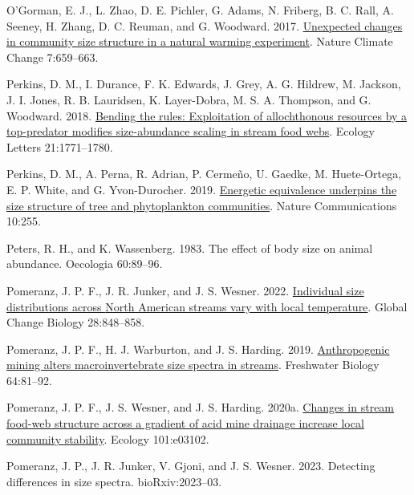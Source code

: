 \documentclass[
  12pt,
]{article}
\newlength{\cslhangindent}
\newlength{\cslentryspacingunit} %
\newenvironment{CSLReferences}[2] %
 {%
  \setlength{\parindent}{0pt}
  \ifodd #1
  \let\oldpar\par
  \def\par{\hangindent=\cslhangindent\oldpar}
  \fi
  \setlength{\parskip}{#2\cslentryspacingunit}
 }%
 {}
\begin{document}
\begin{CSLReferences}{1}{0}
\leavevmode{}%
O'Gorman, E. J., L. Zhao, D. E. Pichler, G. Adams, N. Friberg, B. C.
Rall, A. Seeney, H. Zhang, D. C. Reuman, and G. Woodward. 2017.
\href{https://doi.org/10.1038/nclimate3368}{Unexpected changes in
community size structure in a natural warming experiment}. Nature
Climate Change 7:659--663.

\leavevmode{}%
Perkins, D. M., I. Durance, F. K. Edwards, J. Grey, A. G. Hildrew, M.
Jackson, J. I. Jones, R. B. Lauridsen, K. Layer-Dobra, M. S. A.
Thompson, and G. Woodward. 2018.
\href{https://doi.org/10.1111/ele.13147}{Bending the rules: Exploitation
of allochthonous resources by a top-predator modifies size-abundance
scaling in stream food webs}. Ecology Letters 21:1771--1780.

\leavevmode{}%
Perkins, D. M., A. Perna, R. Adrian, P. Cermeño, U. Gaedke, M.
Huete-Ortega, E. P. White, and G. Yvon-Durocher. 2019.
\href{https://doi.org/10.1038/s41467-018-08039-3}{Energetic equivalence
underpins the size structure of tree and phytoplankton communities}.
Nature Communications 10:255.

\leavevmode{}%
Peters, R. H., and K. Wassenberg. 1983. The effect of body size on
animal abundance. Oecologia 60:89--96.

\leavevmode{}%
Pomeranz, J. P. F., J. R. Junker, and J. S. Wesner. 2022.
\href{https://doi.org/10.1111/gcb.15862}{Individual size distributions
across {North American} streams vary with local temperature}. Global
Change Biology 28:848--858.

\leavevmode{}%
Pomeranz, J. P. F., H. J. Warburton, and J. S. Harding. 2019.
\href{https://doi.org/10.1111/fwb.13196}{Anthropogenic mining alters
macroinvertebrate size spectra in streams}. Freshwater Biology
64:81--92.

\leavevmode{}%
Pomeranz, J. P. F., J. S. Wesner, and J. S. Harding. 2020a.
\href{https://doi.org/10.1002/ecy.3102}{Changes in stream food-web
structure across a gradient of acid mine drainage increase local
community stability}. Ecology 101:e03102.

\leavevmode{}%
Pomeranz, J. P., J. R. Junker, V. Gjoni, and J. S. Wesner. 2023.
Detecting differences in size spectra. bioRxiv:2023--03.


\end{CSLReferences}
\end{document}
